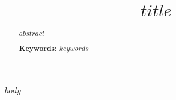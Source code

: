 \documentclass[$document-params$]{article}
\title{$title$}
\begin{document}
\maketitle

\begin{abstract}
$abstract$

\textbf{Keywords:}
$keywords$
\end{abstract}

$body$


\end{document}
